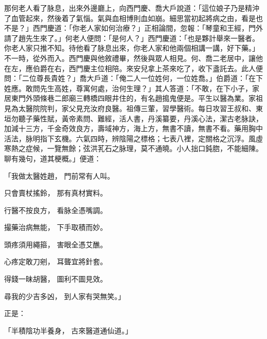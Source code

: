 \begin{showcontents}{}
那何老人看了脉息，出來外邊廳上，向西門慶、喬大戶說道：「這位娘子乃是精沖了血管起來，然後着了氣惱。氣與血相博則血如崩。細思當初起將病之由，看是也不是？」西門慶道：「你老人家如何治療？」正相論間，忽報：「琴童和王經，門外請了趙先生來了。」何老人便問：「是何人？」西門慶道：「也是夥計舉來一醫者。你老人家只推不知。待他看了脉息出來，你老人家和他兩個相講一講，好下藥。」不一時，從外而入。西門慶與他敘禮畢，然後與眾人相見。何、喬二老居中，讓他在左，應伯爵在右，西門慶主位相陪。來安兒拿上茶來吃了，收下盞託去。此人便問：「二位尊長貴姓？」喬大戶道：「俺二人一位姓何，一位姓喬。」伯爵道：「在下姓應。敢問先生高姓，尊寓何處，治何生理？」其人答道：「不敢，在下小子，家居東門外頭條巷二郎廟三轉橋四眼井住的，有名趙搗鬼便是。平生以醫為業。家祖見為太醫院院判，家父見充汝府良醫。祖傳三葷，習學醫術。每日攻習王叔和、東垣勿聽子藥性賦，黃帝素問、難經，活人書，丹溪纂要，丹溪心法，潔古老脉訣，加減十三方，千金奇效良方，壽域神方，海上方，無書不讀，無書不看。藥用胸中活法，脉明指下玄機。六氣四時，辨陰陽之標格；七表八裡，定關格之沉浮。風虛寒熱之症候，一覽無餘；弦洪芤石之脉理，莫不通曉。小人拙口鈍脗，不能細陳。聊有幾句，道其梗概。」便道：

「我做太醫姓趙，  門前常有人叫。

只會賣杖搖鈴，  那有真材實料。

行醫不按良方，  看脉全憑嘴調。

撮藥治病無能，  下手取積而妙。

頭疼須用繩箍，  害眼全憑艾醮。

心疼定敢刀剜，  耳聾宜將針套。

得錢一昧胡醫，  圖利不圖見效。

尋我的少吉多凶，  到人家有哭無笑。」

正是：

「半積陰功半養身，  古來醫道通仙道。」


\end{showcontents}

